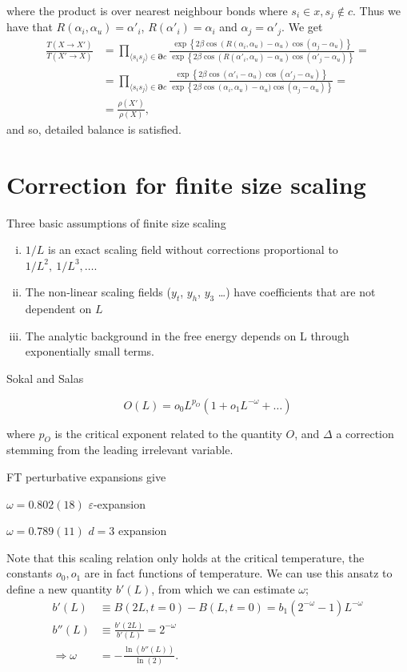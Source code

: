 where the product is over nearest neighbour bonds where $s_i \in x, s_j \notin c$.
Thus we have that $ R(\alpha_i,\alpha_u) = \alpha'_i $, $R(\alpha'_i) = \alpha_i$ and $\alpha_j = \alpha'_j$.
We get
\begin{align}
  \frac{T(X\rightarrow X')}{T(X'\rightarrow X)}&= \prod_{\langle s_i s_j \rangle \in \bm{\partial} c} \frac{ \exp\left\{2\beta\cos(R(\alpha_i,\alpha_u) - \alpha_u)\cos(\alpha_j - \alpha_u)\right\}}{ \exp\left\{2\beta\cos(R(\alpha'_i,\alpha_u) - \alpha_u)\cos(\alpha'_j -\alpha_u)\right\}} = \\
  &= \prod_{\langle s_i s_j \rangle \in \bm{\partial} c} \frac{ \exp\left\{2\beta\cos(\alpha'_i - \alpha_u)\cos(\alpha'_j - \alpha_u)\right\}}{ \exp\left\{2\beta\cos(\alpha_i,\alpha_u) - \alpha_u)\cos(\alpha_j -\alpha_u)\right\}} = \\
  &= \frac{\rho(X')}{\rho(X)},
\end{align}
and so, detailed balance is satisfied.

\section{Correction for finite size scaling}
Three basic assumptions of finite size scaling
\begin{enumerate}[(i)]
  \item $1/L$ is an exact scaling field without corrections proportional to $1/L^2,~1/L^3, \dots$.
  \item The non-linear scaling fields ($y_t$, $y_h$, $y_3$ \dots) have coefficients that are not dependent on $L$
  \item The analytic background in the free energy depends on L through exponentially small terms.


\end{enumerate}
Sokal and Salas

\begin{equation}
  O(L)= o_0 L^{p_O}(1 + o_1 L^{-\omega} + \dots)
  \label{}
\end{equation}

where $p_O$ is the critical exponent related to the quantity $O$, and $\Delta$ a correction stemming from the leading irrelevant variable.

FT perturbative expansions give 

$\omega = 0.802(18)$ $ \varepsilon$-expansion

$\omega = 0.789(11)$ $ d=3$ expansion

Note that this scaling relation only holds at the critical temperature, the constants $o_0, o_1$ are in fact functions of temperature. 
We can use this ansatz to define a new quantity $b'(L)$, from which we can estimate $\omega$;
\begin{align}
  b'(L) &\equiv B(2L,t=0) - B(L,t=0) = b_1(2^{-\omega} -1)L^{-\omega}\\
  b''(L)&\equiv \frac{b'(2L)}{b'(L)} = 2^{-\omega}\\
  \Rightarrow \omega &= -\frac{\ln(b''(L))}{\ln(2)}.
\end{align}

